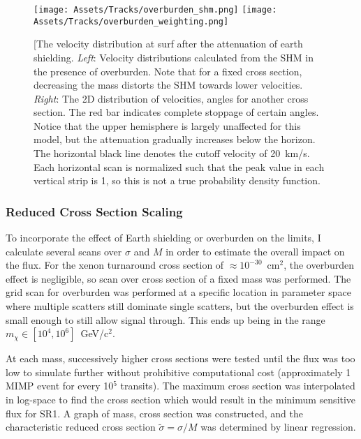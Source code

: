 \begin{figure}
    \centering
    \texttt{[image: Assets/Tracks/overburden\_shm.png]}
        \texttt{[image: Assets/Tracks/overburden\_weighting.png]}

    \caption[The velocity distribution at surf after the attenuation of earth shielding.]%
    {[The velocity distribution at surf after the attenuation of earth shielding.
    \textit{Left}: Velocity distributions calculated from the SHM in the presence of overburden.
    Note that for a fixed cross section, decreasing the mass distorts the SHM towards lower velocities. 
    \textit{Right}: The 2D distribution of velocities, angles for another cross section.
    The red bar indicates complete stoppage of certain angles.
    Notice that the upper hemisphere is largely unaffected for this model, but the attenuation gradually increases below the horizon.
    The horizontal black line denotes the cutoff velocity of 20~km/s.
    Each horizontal scan is normalized such that the peak value in each vertical strip is 1, so this is not a true probability density function.}
    \label{fig:overburden_shm.}
\end{figure}


\subsubsection{Reduced Cross Section Scaling}

To incorporate the effect of Earth shielding or overburden on the limits, I calculate several scans over $\sigma$ and $M$ in order to estimate the overall impact on the flux.
For the xenon turnaround cross section of $\approx 10^{-30}$~cm$^2$, the overburden effect is negligible, so scan over cross section of a fixed mass was performed.
The grid scan for overburden was performed at a specific location in parameter space where multiple scatters still dominate single scatters, but the overburden effect is small enough to still allow signal through.
This ends up being in the range $m_\chi \in [10^4, 10^6]$~GeV/c$^2$.

At each mass, successively higher cross sections were tested until the flux was too low to simulate further without prohibitive computational cost (approximately 1 MIMP event for every 10$^5$ transits).
The maximum cross section was interpolated in log-space to find the cross section which would result in the minimum sensitive flux for SR1.
A graph of mass, cross section was constructed, and the characteristic reduced cross section $\tilde \sigma = \sigma / M$ was determined by linear regression.

